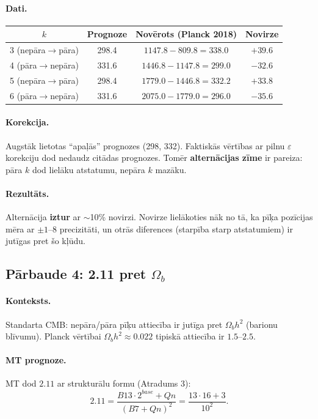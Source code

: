 \documentclass[12pt,a4paper]{article}
\begin{document}
\paragraph{Dati.}
\begin{table}[h]
\centering
\begin{tabular}{|c|c|c|c|}
\hline
$k$ & Prognoze & Novērots (Planck 2018) & Novirze \\
\hline
3 (nepāra$\to$pāra) & 298.4 & $1147.8 - 809.8 = 338.0$ & $+39.6$ \\
4 (pāra$\to$nepāra) & 331.6 & $1446.8 - 1147.8 = 299.0$ & $-32.6$ \\
5 (nepāra$\to$pāra) & 298.4 & $1779.0 - 1446.8 = 332.2$ & $+33.8$ \\
6 (pāra$\to$nepāra) & 331.6 & $2075.0 - 1779.0 = 296.0$ & $-35.6$ \\
\hline
\end{tabular}
\end{table}

\paragraph{Korekcija.}
Augstāk lietotas ``apaļās'' prognozes (298, 332). Faktiskās vērtības ar pilnu $\varepsilon$ korekciju dod nedaudz citādas prognozes. Tomēr \textbf{alternācijas zīme} ir pareiza: pāra $k$ dod lielāku atstatumu, nepāra $k$ mazāku.

\paragraph{Rezultāts.}
Alternācija \textbf{iztur} ar $\sim$10\% novirzi. Novirze lielākoties nāk no tā, ka pīķa pozīcijas mēra ar $\pm 1$--$8$ precizitāti, un otrās diferences (starpība starp atstatumiem) ir jutīgas pret šo kļūdu.

\subsection*{Pārbaude 4: 2.11 pret $\Omega_b$}

\paragraph{Konteksts.}
Standarta CMB: nepāra/pāra pīķu attiecība ir jutīga pret $\Omega_b h^2$ (barionu blīvumu). Planck vērtībai $\Omega_b h^2 \approx 0.022$ tipiskā attiecība ir $1.5$--$2.5$.

\paragraph{MT prognoze.}
MT dod $2.11$ ar strukturālu formu (Atradums 3):
\[
2.11 = \frac{B13 \cdot 2^{base} + Qn}{(B7+Qn)^2} = \frac{13 \cdot 16 + 3}{10^2}.
\]
\end{document}
